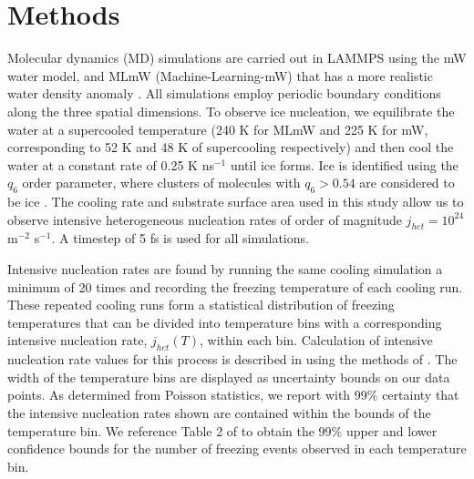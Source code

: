 \documentclass[journal abbreviation, manuscript]{copernicus}
\begin{document}





\section{Methods}

Molecular dynamics (MD) simulations are carried out in LAMMPS \citep{plimpton1995} using the mW \citep{molinero2009} water model, and MLmW (Machine-Learning-mW) that has a more realistic water density anomaly \citep{chan2019}. All simulations employ periodic boundary conditions along the three spatial dimensions. To observe ice nucleation, we equilibrate the water at a supercooled temperature (240 K for MLmW and 225 K for mW, corresponding to 52 K and 48 K of supercooling respectively) and then cool the water at a constant rate of 0.25 K ns$^{-1}$ until ice forms. Ice is identified using the $q_6$ order parameter, where clusters of molecules with $q_6 > 0.54$ are considered to be ice \citep{steinhardt1983,lupi2014,rosky2022}. The cooling rate and substrate surface area used in this study allow us to observe intensive heterogeneous nucleation rates of order of magnitude $j_{het} = 10^{24}$ m$^{-2}$ s$^{-1}$. A timestep of 5 fs is used for all simulations.

Intensive nucleation rates are found by running the same cooling simulation a minimum of 20 times and recording the freezing temperature of each cooling run. These repeated cooling runs form a statistical distribution of freezing temperatures that can be divided into temperature bins with a corresponding intensive nucleation rate, $j_{het}(T)$, within each bin. Calculation of intensive nucleation rate values for this process is described in \citet{rosky2022} using the methods of \citet{zobrist2007}. The width of the temperature bins are displayed as uncertainty bounds on our data points. As determined from Poisson statistics, we report with 99\% certainty that the intensive nucleation rates shown are contained within the bounds of the temperature bin. We reference Table 2 of \citet{koop1997} to obtain the 99\% upper and lower confidence bounds for the number of freezing events observed in each temperature bin.
\end{document}
